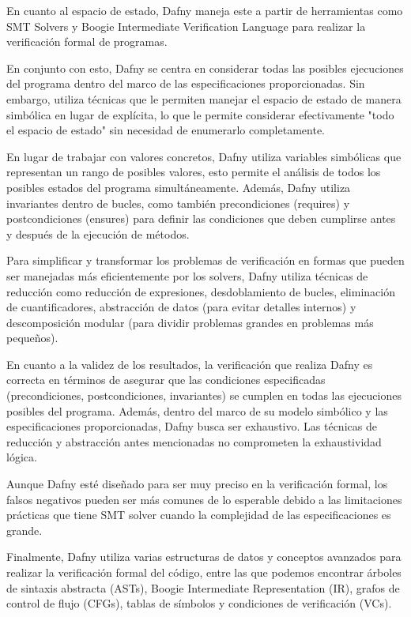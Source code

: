\documentclass[runningheads]{llncs}
\begin{document}
En cuanto al espacio de estado, Dafny maneja este a partir de herramientas como SMT Solvers y Boogie Intermediate Verification Language
para realizar la verificación formal de programas.

En conjunto con esto, Dafny se centra en considerar todas las posibles ejecuciones del programa dentro del marco de las especificaciones proporcionadas. 
Sin embargo, utiliza técnicas que le permiten manejar el espacio de estado de manera simbólica en lugar de explícita, 
lo que le permite considerar efectivamente "todo el espacio de estado" sin necesidad de enumerarlo completamente.

En lugar de trabajar con valores concretos, Dafny utiliza variables simbólicas que representan un rango de posibles valores,
esto permite el análisis de todos los posibles estados del programa simultáneamente.
Además, Dafny utiliza invariantes dentro de bucles, como también precondiciones (requires) y postcondiciones (ensures) para definir las condiciones 
que deben cumplirse antes y después de la ejecución de métodos.

Para simplificar y transformar los problemas de verificación en formas que pueden ser manejadas más eficientemente por los solvers, 
Dafny utiliza técnicas de reducción como reducción de expresiones, desdoblamiento de bucles, eliminación de cuantificadores,
abstracción de datos (para evitar detalles internos) y descomposición modular (para dividir problemas grandes en problemas más pequeños).

En cuanto a la validez de los resultados, la verificación que realiza Dafny es correcta en términos de asegurar que las condiciones
especificadas (precondiciones, postcondiciones, invariantes) se cumplen en todas las ejecuciones posibles del programa. 
Además, dentro del marco de su modelo simbólico y las especificaciones proporcionadas,
Dafny busca ser exhaustivo. Las técnicas de reducción y abstracción antes mencionadas no comprometen la exhaustividad lógica.

Aunque Dafny esté diseñado para ser muy preciso en la verificación formal, 
los falsos negativos pueden ser más comunes de lo esperable debido a las limitaciones prácticas que tiene SMT solver
cuando la complejidad de las especificaciones es grande.

Finalmente, Dafny utiliza varias estructuras de datos y conceptos avanzados para realizar la verificación formal del código,
entre las que podemos encontrar árboles de sintaxis abstracta (ASTs), Boogie Intermediate Representation (IR), grafos de control de flujo (CFGs),
tablas de símbolos y condiciones de verificación (VCs).
\end{document}
